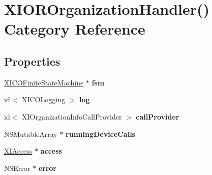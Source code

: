 \hypertarget{category_x_i_o_r_organization_handler_07_08}{}\section{X\+I\+O\+R\+Organization\+Handler() Category Reference}
\label{category_x_i_o_r_organization_handler_07_08}
\subsection*{Properties}
\begin{DoxyCompactItemize}
\item 
\hypertarget{category_x_i_o_r_organization_handler_07_08_a45ddfc827622e79f35645188641f78f5}{}\label{category_x_i_o_r_organization_handler_07_08_a45ddfc827622e79f35645188641f78f5} 
\hyperlink{class_x_i_c_o_finite_state_machine}{X\+I\+C\+O\+Finite\+State\+Machine} $\ast$ {\bfseries fsm}
\item 
\hypertarget{category_x_i_o_r_organization_handler_07_08_af5bedbe3bd8c586675a4ab81ae9c1b99}{}\label{category_x_i_o_r_organization_handler_07_08_af5bedbe3bd8c586675a4ab81ae9c1b99} 
id$<$ \hyperlink{protocol_x_i_c_o_logging-p}{X\+I\+C\+O\+Logging} $>$ {\bfseries log}
\item 
\hypertarget{category_x_i_o_r_organization_handler_07_08_af4bbda209003faaa020ea40205915f00}{}\label{category_x_i_o_r_organization_handler_07_08_af4bbda209003faaa020ea40205915f00} 
id$<$ X\+I\+Organization\+Info\+Call\+Provider $>$ {\bfseries call\+Provider}
\item 
\hypertarget{category_x_i_o_r_organization_handler_07_08_a1ed2104fa151605d310c445557c7140d}{}\label{category_x_i_o_r_organization_handler_07_08_a1ed2104fa151605d310c445557c7140d} 
N\+S\+Mutable\+Array $\ast$ {\bfseries running\+Device\+Calls}
\item 
\hypertarget{category_x_i_o_r_organization_handler_07_08_ad8cf1c131ea8ff218cff33be03818359}{}\label{category_x_i_o_r_organization_handler_07_08_ad8cf1c131ea8ff218cff33be03818359} 
\hyperlink{class_x_i_access}{X\+I\+Access} $\ast$ {\bfseries access}
\item 
\hypertarget{category_x_i_o_r_organization_handler_07_08_aa9c31992dc1606c934df4f9a111186c6}{}\label{category_x_i_o_r_organization_handler_07_08_aa9c31992dc1606c934df4f9a111186c6} 
N\+S\+Error $\ast$ {\bfseries error}
\item 
\hypertarget{category_x_i_o_r_organization_handler_07_08_a252d4c2017dc3cbe84e1e3140d857c74}{}\label{category_x_i_o_r_organization_handler_07_08_a252d4c2017dc3cbe84e1e3140d857c74} 

\end{DoxyCompactItemize}
